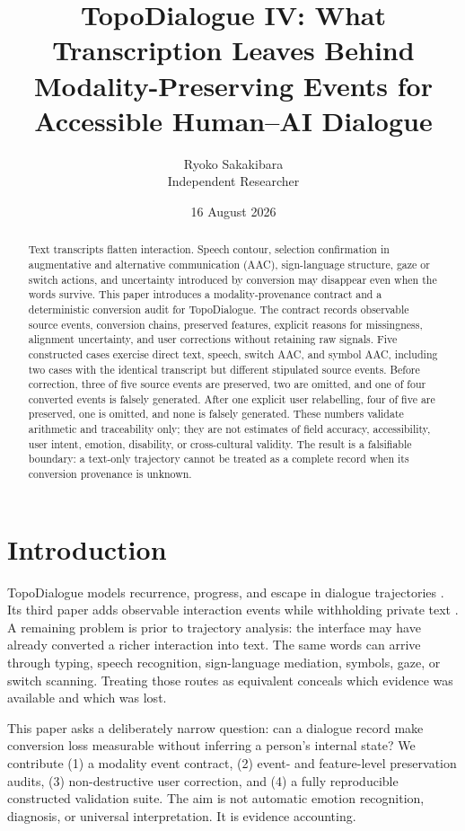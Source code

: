 \documentclass[11pt,a4paper]{article}
\title{TopoDialogue IV: What Transcription Leaves Behind\\Modality-Preserving Events for Accessible Human--AI Dialogue}
\author{Ryoko Sakakibara\\Independent Researcher}
\date{16 August 2026}
\begin{document}
\maketitle
\begin{abstract}
Text transcripts flatten interaction. Speech contour, selection confirmation in augmentative and alternative communication (AAC), sign-language structure, gaze or switch actions, and uncertainty introduced by conversion may disappear even when the words survive. This paper introduces a modality-provenance contract and a deterministic conversion audit for TopoDialogue. The contract records observable source events, conversion chains, preserved features, explicit reasons for missingness, alignment uncertainty, and user corrections without retaining raw signals. Five constructed cases exercise direct text, speech, switch AAC, and symbol AAC, including two cases with the identical transcript but different stipulated source events. Before correction, three of five source events are preserved, two are omitted, and one of four converted events is falsely generated. After one explicit user relabelling, four of five are preserved, one is omitted, and none is falsely generated. These numbers validate arithmetic and traceability only; they are not estimates of field accuracy, accessibility, user intent, emotion, disability, or cross-cultural validity. The result is a falsifiable boundary: a text-only trajectory cannot be treated as a complete record when its conversion provenance is unknown.
\end{abstract}

\section{Introduction}
TopoDialogue models recurrence, progress, and escape in dialogue trajectories \cite{sakakibara2026concept,sakakibara2026instrument}. Its third paper adds observable interaction events while withholding private text \cite{sakakibara2026implicit}. A remaining problem is prior to trajectory analysis: the interface may have already converted a richer interaction into text. The same words can arrive through typing, speech recognition, sign-language mediation, symbols, gaze, or switch scanning. Treating those routes as equivalent conceals which evidence was available and which was lost.

This paper asks a deliberately narrow question: can a dialogue record make conversion loss measurable without inferring a person's internal state? We contribute (1) a modality event contract, (2) event- and feature-level preservation audits, (3) non-destructive user correction, and (4) a fully reproducible constructed validation suite. The aim is not automatic emotion recognition, diagnosis, or universal interpretation. It is evidence accounting.
\end{document}
